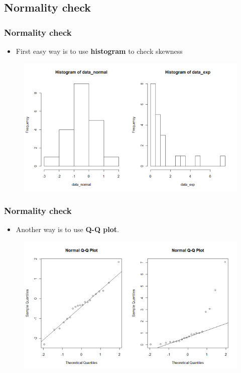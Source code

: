 \documentclass{beamer}
\begin{document}
\subsection{Normality check}

\begin{frame}
	\frametitle{Normality check} 
	\begin{itemize}
		\item First easy way is to use \textbf{histogram} to check skewness
	\end{itemize}
	\begin{figure}
		\includegraphics[width=0.8\linewidth]{histogram}
	\end{figure}
\end{frame}

\begin{frame}
	\frametitle{Normality check} 
	\begin{itemize}
		\item Another way is to use \textbf{Q-Q plot}.  %
	\end{itemize}
	\begin{figure}
		\includegraphics[width=0.8\linewidth]{qqplot}
	\end{figure}
\end{frame}
\end{document}

